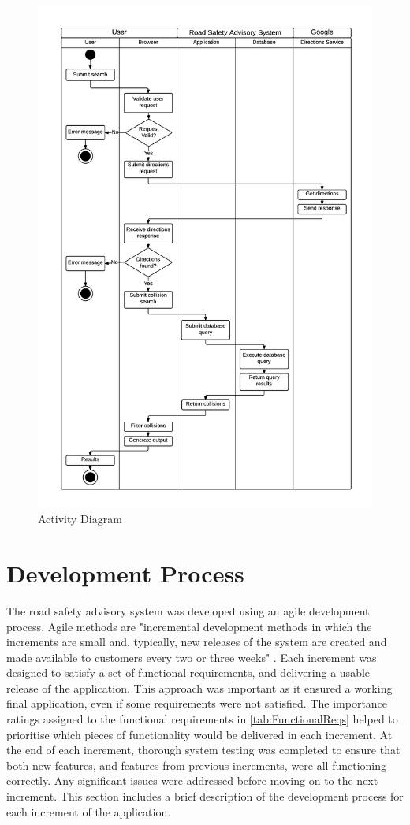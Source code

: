 \documentclass[authoryearcitations]{UoYCSproject}
\begin{document}
\begin{figure}
	\includegraphics[scale=0.6]{activitydiagram}
	\caption{Activity Diagram}
	\label{fig:activitydiagram}
\end{figure}

\section{Development Process}

The road safety advisory system was developed using an agile development process. Agile methods are "incremental development methods in which the increments are small and, typically, new releases of the system are created and made available to customers every two or three weeks" \citep{Sommerville2005}. Each increment was designed to satisfy a set of functional requirements, and delivering a usable release of the application. This approach was important as it ensured a working final application, even if some requirements were not satisfied. The importance ratings assigned to the functional requirements in \autoref{tab:FunctionalReqs} helped to prioritise which pieces of functionality would be delivered in each increment. At the end of each increment, thorough system testing was completed to ensure that both new features, and features from previous increments, were all functioning correctly. Any significant issues were addressed before moving on to the next increment. This section includes a brief description of the development process for each increment of the application.
\end{document}
